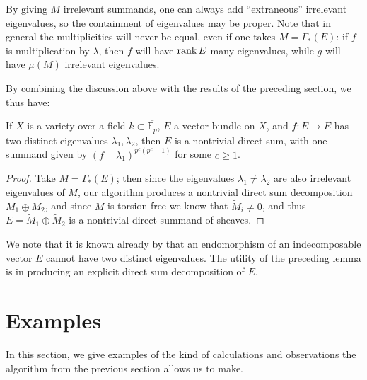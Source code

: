 \documentclass[12pt]{article}
\let\l\lambda
\numberwithin{equation}{section}
\theoremstyle{theorem}
\numberwithin{thm}{section}
\theoremstyle{definition}
\begin{document}
\begin{exa}
By giving $M$ irrelevant summands, one can always add ``extraneous'' irrelevant eigenvalues, so the containment of eigenvalues may be proper.
Note that in general the multiplicities will never be equal, even if one takes $M=\Gamma_*(E)$: if $f$ is multiplication by $\l$, then $f$ will have $\operatorname{rank} E$ many eigenvalues, while $g$ will have $\mu(M)$ irrelevant eigenvalues.
\end{exa}

By combining the discussion above with the results of the preceding section, we thus have:

\begin{prop}
If $X$ is a variety over a field $k\subset \overline{\mathbb F_{p}}$,
$E$ a vector bundle on $X$, and $f:E\to E$ has two distinct eigenvalues $\l_1,\l_2$, then $E$ is a nontrivial direct sum, with one summand given by $(f-\l_1)^{p^e(p^e-1)}$ for some $e\geq 1$.
\end{prop}

\begin{proof}
Take $M= \Gamma_*(E)$; then since the eigenvalues $\l_1\neq \l_2$ are also irrelevant eigenvalues of $M$, our algorithm produces a nontrivial direct sum decomposition $M_1\oplus M_2$, and since $M$ is torsion-free we know that $\widetilde M_i\neq 0$, and thus $E=\widetilde M_1\oplus \widetilde M_2$ is a nontrivial direct summand of sheaves.
\end{proof}

\begin{rem}
We note that it is known already by \cite[Proposition~15]{Atiyah} that an endomorphism of an indecomposable vector $E$ cannot have two distinct eigenvalues. The utility of the preceding lemma is in producing an explicit direct sum decomposition of $E$.
\end{rem}



\section{Examples}

In this section, we give examples of the kind of calculations and observations the algorithm from the previous section allows us to make.
\end{document}
